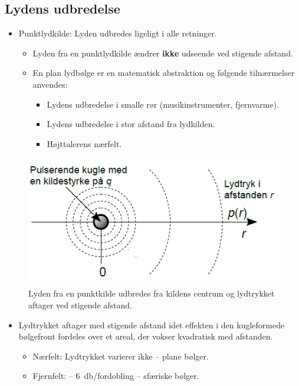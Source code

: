 \subsection{Lydens udbredelse}

\begin{itemize}
	\item Punktlydkilde: Lyden udbredes ligeligt i alle retninger.
	\begin{itemize}
		\item Lyden fra en punktlydkilde ændrer \textbf{ikke} udseende ved stigende afstand.
		\item En plan lydbølge er en matematisk abstraktion og følgende tilnærmelser anvendes:
		\begin{itemize}
			\item Lydens udbredelse i smalle rør (musikinstrumenter, fjernvarme).
			\item Lydens udbredelse i stor afstand fra lydkilden.
			\item Højttalerens nærfelt.
		\end{itemize}
	\end{itemize}
\end{itemize}

\begin{figure} [H]
	\centering
	\includegraphics[width=0.65\linewidth]{graphics/9.png}
	\caption{Lyden fra en punktkilde udbredes fra kildens centrum og lydtrykket aftager ved stigende afstand.}
	\label{fig:9}
\end{figure}

\begin{itemize}
	\item Lydtrykket aftager med stigende afstand idet effekten i den kugleformede bølgefront fordeles over et areal, der vokser kvadratisk med afstanden.
	\begin{itemize}
		\item Nærfelt: Lydtrykket varierer ikke – plane bølger.
		\item Fjernfelt: – \SI{6}{\decibel}/fordobling – sfæriske bølger.
	\end{itemize}
\end{itemize}

